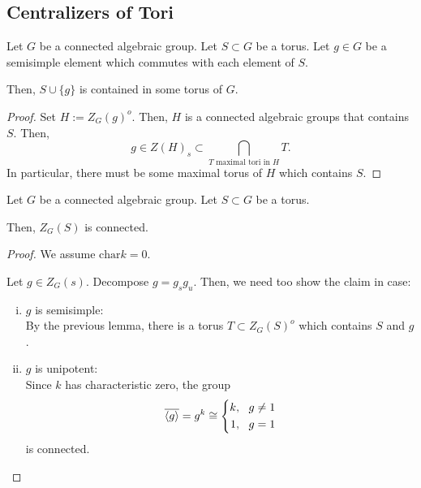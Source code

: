 \subsection{Centralizers of Tori}

\begin{lemma}
	Let $G$ be a connected algebraic group. Let $S\subset G$ be a torus. Let $g \in G$ be a semisimple element which commutes with each element of $S$.
	
	Then, $S\cup\{g\}$ is contained in some torus of $G$.
\end{lemma}
\begin{proof}
	Set $H := Z_G(g)^o$. Then, $H$ is a connected algebraic groups that contains $S$. Then,
	\[ g \in Z(H)_s \subset \bigcap_{T \text{ maximal tori in }H}T. \]
	In particular, there must be some maximal torus of $H$ which contains $S$.
\end{proof}

\begin{theorem}
	Let $G$ be a connected algebraic group. Let $S\subset G$ be a torus.
	
	Then, $Z_G(S)$ is connected.
\end{theorem}
\begin{proof}
	We assume $\mathrm{char} k = 0$.
	
	Let $g \in Z_G(s)$. Decompose $g = g_sg_u$. Then, we need too show the claim in case:
	\begin{enumerate}[(i)]
		\item $g$ is semisimple:\\
		By the previous lemma, there is a torus $T\subset Z_G(S)^o$ which contains $S$ and $g$.
		\item $g$ is unipotent:\\
		Since $k$ has characteristic zero, the group
		\[ \overline{\left<g\right>} = g^k \overset{}{\cong} \left\lbrace 
		\begin{aligned}
		k, ~~ g\neq 1 \\ 1, ~~ g = 1
		\end{aligned}
		\right. \]
		is connected.
	\end{enumerate}
\end{proof}